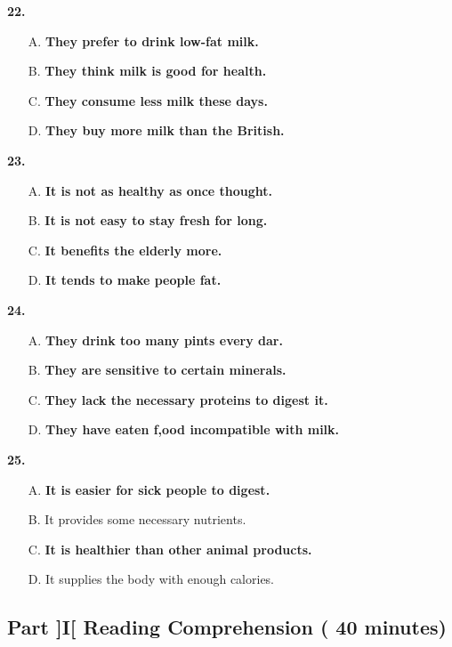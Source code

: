 \documentclass[UTF8,11pt]{ctexart}
\begin{document}
\textbf{22.}


\begin{itemize}[leftmargin=2em,itemsep=.2em,topsep=.4em]\item[A.] \textbf{They prefer to drink low-fat milk.}
\item[B.] \textbf{They think milk is good for health.}
\item[C.] \textbf{They consume less milk these days.}
\item[D.] \textbf{They buy more milk than the British.}
\end{itemize}

\textbf{23.}


\begin{itemize}[leftmargin=2em,itemsep=.2em,topsep=.4em]\item[A.] \textbf{It is not as healthy as once thought.}
\item[B.] \textbf{It is not easy to stay fresh for long.}
\item[C.] \textbf{It benefits the elderly more.}
\item[D.] \textbf{It tends to make people fat.}
\end{itemize}

\textbf{24.}


\begin{itemize}[leftmargin=2em,itemsep=.2em,topsep=.4em]\item[A.] \textbf{They drink too many pints every dar\textperiodcentered{}.}
\item[B.] \textbf{They are sensitive to certain minerals.}
\item[C.] \textbf{They lack the necessary proteins to digest it.}
\item[D.] \textbf{They have eaten f,ood incompatible with milk.}
\end{itemize}

\textbf{25.}


\begin{itemize}[leftmargin=2em,itemsep=.2em,topsep=.4em]\item[A.] \textbf{It is easier for sick people to digest.}
\item[B.] It provides some necessary nutrients.
\item[C.] \textbf{It is healthier than other animal products.}
\item[D.] It supplies the body with enough calories.
\end{itemize}

\subsection*{\textbf{Part ]I[} \textbf{Reading Comprehension} \textbf{( 40 minutes)}}
\end{document}
